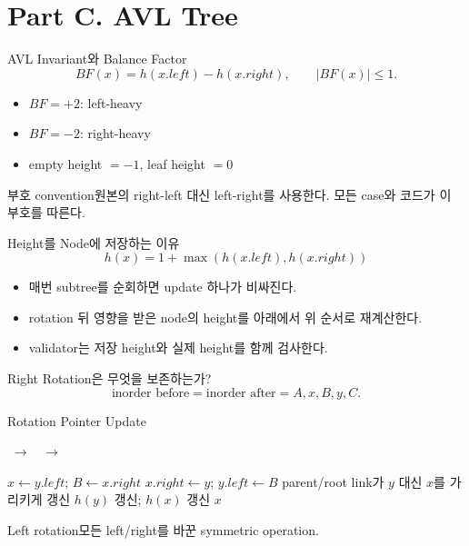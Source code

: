 \section{Part C. AVL Tree}
\begin{frame}{AVL Invariant와 Balance Factor}
\[
BF(x)=h(x.left)-h(x.right),\qquad |BF(x)|\le1.
\]
\begin{itemize}\item $BF=+2$: left-heavy\item $BF=-2$: right-heavy\item empty height $=-1$, leaf height $=0$\end{itemize}
\begin{alertblock}{부호 convention}원본의 right-left 대신 left-right를 사용한다. 모든 case와 코드가 이 부호를 따른다.\end{alertblock}
\end{frame}
\begin{frame}{Height를 Node에 저장하는 이유}
\[
h(x)=1+\max(h(x.left),h(x.right))
\]
\begin{itemize}\item 매번 subtree를 순회하면 update 하나가 비싸진다.\item rotation 뒤 영향을 받은 node의 height를 아래에서 위 순서로 재계산한다.\item validator는 저장 height와 실제 height를 함께 검사한다.\end{itemize}
\end{frame}
\begin{frame}{Right Rotation은 무엇을 보존하는가?}
\centering
{}
\[
\text{inorder before}=\text{inorder after}=A,x,B,y,C.
\]
\end{frame}
\begin{frame}{Rotation Pointer Update}
\begin{center}
$\;\to\;$ 
$\;\to\;$ 
\end{center}
\small\begin{algorithmic}[1]
\State $x\gets y.left$; $B\gets x.right$
\State $x.right\gets y$; $y.left\gets B$
\State parent/root link가 $y$ 대신 $x$를 가리키게 갱신
\State $h(y)$ 갱신; $h(x)$ 갱신
\State\Return $x$
\EndProcedure
\end{algorithmic}
\begin{block}{Left rotation}모든 left/right를 바꾼 symmetric operation.\end{block}
\end{frame}
